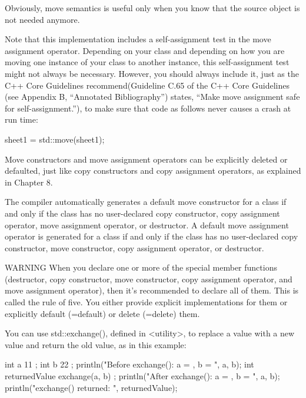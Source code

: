 Obviously, move semantics is useful only when you know that the source object is not needed anymore.

Note that this implementation includes a self-assignment test in the move assignment operator. Depending on your class and depending on how you are moving one instance of your class to another instance, this self-assignment test might not always be necessary. However, you should always include it, just as the C++ Core Guidelines recommend(Guideline C.65 of the C++ Core Guidelines (see Appendix B, “Annotated Bibliography”) states, “Make move assignment safe for self-assignment.”), to make sure that code as follows never causes a crash at run time:

\begin{cpp}
sheet1 = std::move(sheet1);
\end{cpp}

Move constructors and move assignment operators can be explicitly deleted or defaulted, just like copy constructors and copy assignment operators, as explained in Chapter 8.

The compiler automatically generates a default move constructor for a class if and only if the class has no user-declared copy constructor, copy assignment operator, move assignment operator, or destructor. A default move assignment operator is generated for a class if and only if the class has no user-declared copy constructor, move constructor, copy assignment operator, or destructor.

\begin{myWarning}{WARNING}
When you declare one or more of the special member functions (destructor, copy constructor, move constructor, copy assignment operator, and move assignment operator), then it’s recommended to declare all of them. This is called the rule of five. You either provide explicit implementations for them or explicitly default (=default) or delete (=delete) them.
\end{myWarning}


You can use std::exchange(), defined in <utility>, to replace a value with a new value and return the old value, as in this example:

\begin{cpp}
int a { 11 };
int b { 22 };
println("Before exchange(): a = {}, b = {}", a, b);
int returnedValue { exchange(a, b) };
println("After exchange(): a = {}, b = {}", a, b);
println("exchange() returned: {}", returnedValue);
\end{cpp}

